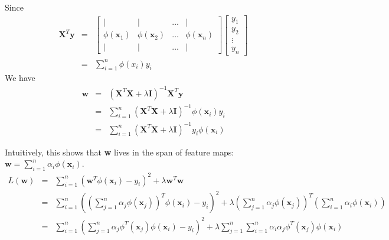 \documentclass[12pt]{article}
\begin{document}
Since
\begin{eqnarray*}
  \textbf{X}^T \textbf{y} &=&
  \begin{bmatrix}
    | & | & \dots  & | \\
    \phi(\textbf{x}_1) & \phi(\textbf{x}_2) & \dots & \phi(\textbf{x}_n) \\
    | & | & \dots  & |
  \end{bmatrix}
  \begin{bmatrix}
    y_1 \\
    y_2 \\
    \vdots \\
    y_n
  \end{bmatrix} \\
  &=& \sum_{i=1}^n \phi(x_i) y_i
\end{eqnarray*}
We have
\begin{eqnarray*}
  \textbf{w}
  &=& \left( \textbf{X}^T \textbf{X} + \lambda \textbf{I} \right)^{-1}
  \textbf{X}^T \textbf{y} \\
  &=& \sum_{i=1}^n
  \left( \textbf{X}^T \textbf{X} + \lambda \textbf{I} \right)^{-1}
  \phi(\textbf{x}_i) y_i \\
  &=& \sum_{i=1}^n
  \left( \textbf{X}^T \textbf{X} + \lambda \textbf{I} \right)^{-1}
  y_i \phi(\textbf{x}_i) 
\end{eqnarray*}

Intuitively, this shows that \textbf{w} lives in the span of feature maps: $\textbf{w} = \sum_{i=1}^n \alpha_i \phi(\textbf{x}_i)$. \\

\begin{eqnarray*}
  L(\textbf{w})
  &=& \sum_{i=1}^n \left(\textbf{w}^T \phi(\textbf{x}_i) - y_i \right)^2
  + \lambda \textbf{w}^T \textbf{w} \\
  &=& \sum_{i=1}^n \left(
    \left( \sum_{j=1}^n \alpha_j \phi(\textbf{x}_j) \right)^T 
    \phi(\textbf{x}_i) - y_i \right)^2
  + \lambda \left( \sum_{j=1}^n \alpha_j \phi(\textbf{x}_j) \right)^T
  \left( \sum_{i=1}^n \alpha_i \phi(\textbf{x}_i) \right) \\
  &=& \sum_{i=1}^n \left( \sum_{j=1}^n \alpha_j \phi^T(\textbf{x}_j)
    \phi(\textbf{x}_i) - y_i \right)^2
  + \lambda \sum_{j=1}^n \sum_{i=1}^n \alpha_i \alpha_j 
  \phi^T(\textbf{x}_j) \phi(\textbf{x}_i) \\
\end{eqnarray*}
\end{document}
